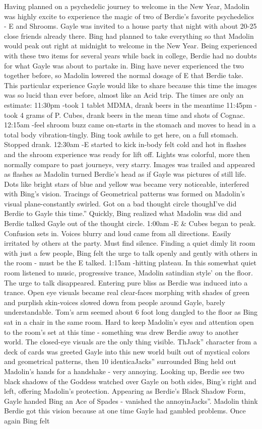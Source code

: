 \documentclass[12pt]{book}
\begin{document}
Having planned on a psychedelic journey to welcome in the New Year, Madolin was highly excite to experience the magic of two of Berdie's favorite psychedelics - E and Shrooms. Gayle was invited to a house party that night with about 20-25 close friends already there. Bing had planned to take everything so that Madolin would peak out right at midnight to welcome in the New Year. Being experienced with these two items for several years while back in college, Berdie had no doubts for what Gayle was about to partake in. Bing have never experienced the two together before, so Madolin lowered the normal dosage of E that Berdie take. This particular experience Gayle would like to share because this time the images was so lucid than ever before, almost like an Acid trip. The times are only an estimate: 11:30pm -took 1 tablet MDMA, drank beers in the meantime 11:45pm -took 4 grams of P. Cubes, drank beers in the mean time and shots of Cognac. 12:15am -feel shroom buzz came on-starts in the stomach and moves to head in a total body vibration-tingly. Bing took awhile to get here, on a full stomach. Stopped drank. 12:30am -E started to kick in-body felt cold and hot in flashes and the shroom experience was ready for lift off. Lights was colorful, more then normally compare to past journeys, very starry. Images was trailed and appeared as flashes as Madolin turned Berdie's head as if Gayle was pictures of still life. Dots like bright stars of blue and yellow was became very noticeable, interfered with Bing's vision. Tracings of Geometrical patterns was formed on Madolin's visual plane-constantly swirled. Got on a bad thought circle thoughI've did Berdie to Gayle this time.'' Quickly, Bing realized what Madolin was did and Berdie talked Gayle out of the thought circle. 1:00am -E \& Cubes began to peak. Confusion sets in. Voices blurry and loud came from all directions. Easily irritated by others at the party. Must find silence. Finding a quiet dimly lit room with just a few people, Bing felt the urge to talk openly and gently with others in the room - must be the E talked. 1:15am -hitting plateau. In this somewhat quiet room listened to music, progressive trance, Madolin satindian style' on the floor. The urge to talk disappeared. Entering pure bliss as Berdie was induced into a trance. Open eye visuals became real clear-faces morphing with shades of green and purplish skin-voices slowed down from people around Gayle, barely understandable. Tom's arm seemed about 6 foot long dangled to the floor as Bing sat in a chair in the same room. Hard to keep Madolin's eyes and attention open to the room's set at this time - something was drew Berdie away to another world. The closed-eye visuals are the only thing visible. ThJack'' character from a deck of cards was greeted Gayle into this new world built out of mystical colors and geometrical patterns, then 10 identicaJacks'' surrounded Bing held out Madolin's hands for a handshake - very annoying. Looking up, Berdie see two black shadows of the Goddess watched over Gayle on both sides, Bing's right and left, offering Madolin's protection. Appearing as Berdie's Black Shadow Form, Gayle handed Bing an Ace of Spades - vanished the annoyinJacks''. Madolin think Berdie got this vision because at one time Gayle had gambled problems. Once again Bing felt 
\end{document}
